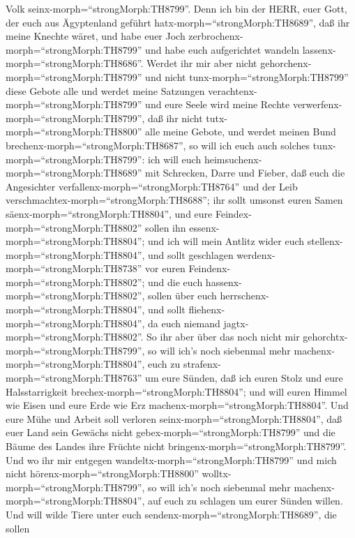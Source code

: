 Volk seinx-morph=``strongMorph:TH8799''.  Denn ich bin der
HERR, euer Gott, der euch aus Ägyptenland geführt
hatx-morph=``strongMorph:TH8689'', daß ihr meine Knechte wäret, und habe
euer Joch zerbrochenx-morph=``strongMorph:TH8799'' und habe euch
aufgerichtet wandeln lassenx-morph=``strongMorph:TH8686''. 
Werdet ihr mir aber nicht gehorchenx-morph=``strongMorph:TH8799'' und
nicht tunx-morph=``strongMorph:TH8799'' diese Gebote alle 
und werdet meine Satzungen verachtenx-morph=``strongMorph:TH8799'' und
eure Seele wird meine Rechte verwerfenx-morph=``strongMorph:TH8799'',
daß ihr nicht tutx-morph=``strongMorph:TH8800'' alle meine Gebote, und
werdet meinen Bund brechenx-morph=``strongMorph:TH8687'', 
so will ich euch auch solches tunx-morph=``strongMorph:TH8799'': ich
will euch heimsuchenx-morph=``strongMorph:TH8689'' mit Schrecken, Darre
und Fieber, daß euch die Angesichter
verfallenx-morph=``strongMorph:TH8764'' und der Leib
verschmachtex-morph=``strongMorph:TH8688''; ihr sollt umsonst euren
Samen säenx-morph=``strongMorph:TH8804'', und eure
Feindex-morph=``strongMorph:TH8802'' sollen ihn
essenx-morph=``strongMorph:TH8804'';  und ich will mein
Antlitz wider euch stellenx-morph=``strongMorph:TH8804'', und sollt
geschlagen werdenx-morph=``strongMorph:TH8738'' vor euren
Feindenx-morph=``strongMorph:TH8802''; und die euch
hassenx-morph=``strongMorph:TH8802'', sollen über euch
herrschenx-morph=``strongMorph:TH8804'', und sollt
fliehenx-morph=``strongMorph:TH8804'', da euch niemand
jagtx-morph=``strongMorph:TH8802''.  So ihr aber über das
noch nicht mir gehorchtx-morph=``strongMorph:TH8799'', so will ich's
noch siebenmal mehr machenx-morph=``strongMorph:TH8804'', euch zu
strafenx-morph=``strongMorph:TH8763'' um eure Sünden,  daß
ich euren Stolz und eure Halsstarrigkeit
brechex-morph=``strongMorph:TH8804''; und will euren Himmel wie Eisen
und eure Erde wie Erz machenx-morph=``strongMorph:TH8804''.
 Und eure Mühe und Arbeit soll verloren
seinx-morph=``strongMorph:TH8804'', daß euer Land sein Gewächs nicht
gebex-morph=``strongMorph:TH8799'' und die Bäume des Landes ihre Früchte
nicht bringenx-morph=``strongMorph:TH8799''.  Und wo ihr
mir entgegen wandeltx-morph=``strongMorph:TH8799'' und mich nicht
hörenx-morph=``strongMorph:TH8800'' wolltx-morph=``strongMorph:TH8799'',
so will ich's noch siebenmal mehr machenx-morph=``strongMorph:TH8804'',
auf euch zu schlagen um eurer Sünden willen.  Und will
wilde Tiere unter euch sendenx-morph=``strongMorph:TH8689'', die sollen
